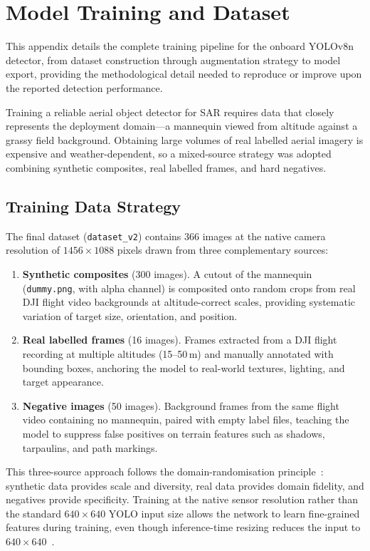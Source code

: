 \section{Model Training and Dataset}\label{sec:training}

This appendix details the complete training pipeline for the onboard YOLOv8n detector, from dataset construction through augmentation strategy to model export, providing the methodological detail needed to reproduce or improve upon the reported detection performance.

Training a reliable aerial object detector for SAR requires data that closely represents the deployment domain---a mannequin viewed from altitude against a grassy field background. Obtaining large volumes of real labelled aerial imagery is expensive and weather-dependent, so a mixed-source strategy was adopted combining synthetic composites, real labelled frames, and hard negatives.

\subsection{Training Data Strategy}\label{sec:training:strategy}

The final dataset (\texttt{dataset\_v2}) contains 366 images at the native camera resolution of $1456\times1088$ pixels drawn from three complementary sources:

\begin{enumerate}
    \item \textbf{Synthetic composites} (300 images). A cutout of the mannequin (\texttt{dummy.png}, with alpha channel) is composited onto random crops from real DJI flight video backgrounds at altitude-correct scales, providing systematic variation of target size, orientation, and position.
    \item \textbf{Real labelled frames} (16 images). Frames extracted from a DJI flight recording at multiple altitudes (15--50\,m) and manually annotated with bounding boxes, anchoring the model to real-world textures, lighting, and target appearance.
    \item \textbf{Negative images} (50 images). Background frames from the same flight video containing no mannequin, paired with empty label files, teaching the model to suppress false positives on terrain features such as shadows, tarpaulins, and path markings.
\end{enumerate}

This three-source approach follows the domain-randomisation principle~\cite{domainrand}: synthetic data provides scale and diversity, real data provides domain fidelity, and negatives provide specificity. Training at the native sensor resolution rather than the standard $640\times640$ YOLO input size allows the network to learn fine-grained features during training, even though inference-time resizing reduces the input to $640\times640$~\cite{yolov8}.

